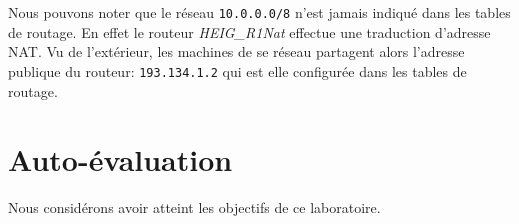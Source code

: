 \documentclass[11pt,a4paper]{article}
\begin{document}
\vspace{0.3cm}

Nous pouvons noter que le réseau \texttt{10.0.0.0/8} n'est jamais indiqué dans les tables de routage. En effet le routeur \textit{HEIG\_R1Nat} effectue une traduction d'adresse NAT. Vu de l'extérieur, les machines de se réseau partagent alors l'adresse publique du routeur: \texttt{193.134.1.2} qui est elle configurée dans les tables de routage.

\section{Auto-évaluation}

Nous considérons avoir atteint les objectifs de ce laboratoire.
\end{document}
